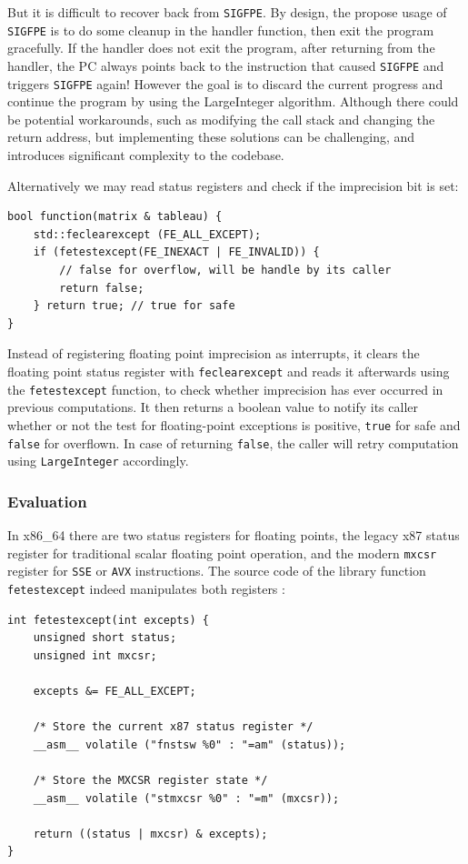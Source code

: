 \documentclass[logo,bsc,singlespacing,parskip]{infthesis}
\newcommand{\sigfpe}{\texttt{SIGFPE}}
\newcommand{\mxcsr}{\texttt{mxcsr}}
\begin{document}
But it is difficult to recover back from \sigfpe{}. By design, the propose usage
of \sigfpe{} is to do some cleanup in the handler function, then exit the program
gracefully. If the handler does not exit the program, after returning from the
handler, the PC always points back to the instruction that caused \sigfpe{} and
triggers \sigfpe{} again! However the goal is to discard the current progress and
continue the program by using the LargeInteger algorithm. Although there could
be potential workarounds, such as modifying the call stack and changing the
return address, but implementing these solutions can be challenging, and
introduces significant complexity to the codebase.

Alternatively we may read status registers and check if the imprecision bit is
set: 
\begin{verbatim}
bool function(matrix & tableau) {
    std::feclearexcept (FE_ALL_EXCEPT);
    if (fetestexcept(FE_INEXACT | FE_INVALID)) {
        // false for overflow, will be handle by its caller
        return false; 
    } return true; // true for safe
}
\end{verbatim}

Instead of registering floating point imprecision as interrupts, it clears the
floating point status register with \texttt{feclearexcept} and reads it
afterwards using the
\texttt{fetestexcept} function, to check whether imprecision has ever occurred
in previous computations. It then returns a boolean value to notify its caller
whether or not the test for floating-point exceptions is positive, \texttt{true}
for safe and \texttt{false} for overflown. In case of returning \texttt{false}, 
the caller will retry computation using \texttt{LargeInteger} accordingly. 



\subsubsection{Evaluation}
In x86\_64 there are two status registers for floating points, the legacy x87
status register for traditional scalar floating point operation, and the modern
\mxcsr{} register for \texttt{SSE} or \texttt{AVX} instructions. The source code
of the library function \texttt{fetestexcept} indeed manipulates both registers
\cite{fenvlib}: 
\begin{verbatim}
int fetestexcept(int excepts) {
    unsigned short status;
    unsigned int mxcsr;

    excepts &= FE_ALL_EXCEPT;

    /* Store the current x87 status register */
    __asm__ volatile ("fnstsw %0" : "=am" (status));

    /* Store the MXCSR register state */
    __asm__ volatile ("stmxcsr %0" : "=m" (mxcsr));

    return ((status | mxcsr) & excepts);
}
\end{verbatim}
\end{document}
